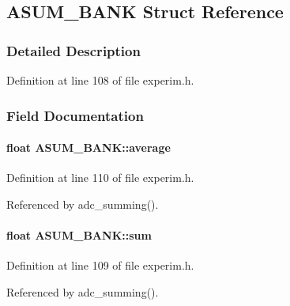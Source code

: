 \subsection{ASUM\_\-BANK Struct Reference}
\label{structASUM__BANK}


\subsubsection{Detailed Description}


Definition at line 108 of file experim.h.

\subsubsection{Field Documentation}
\paragraph[{average}]{\setlength{\rightskip}{0pt plus 5cm}float {\bf ASUM\_\-BANK::average}}\hfill\label{structASUM__BANK_a4c8cbb0db1a9d801d827baa9a4476ccb}


Definition at line 110 of file experim.h.

Referenced by adc\_\-summing().
\paragraph[{sum}]{\setlength{\rightskip}{0pt plus 5cm}float {\bf ASUM\_\-BANK::sum}}\hfill\label{structASUM__BANK_a7a1d3eb20e09617e018b2644f2a5b9bc}


Definition at line 109 of file experim.h.

Referenced by adc\_\-summing().